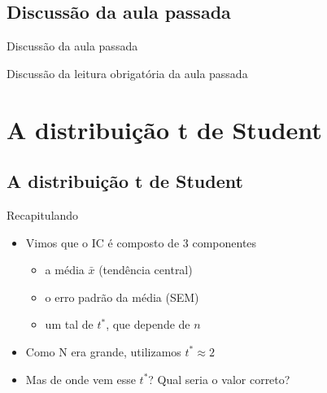 \documentclass{beamer}
\begin{document}
\subsection{Discussão da aula passada}

\begin{frame}{Discussão da aula passada}
  \begin{block}{}
    Discussão da leitura obrigatória da aula passada
  \end{block}
\end{frame}

\section[t de Student]{A distribuição t de Student}

\subsection{A distribuição t de Student}

\begin{frame}{Recapitulando}
  \begin{itemize}
  \item Vimos que o IC é composto de 3 componentes
    \begin{itemize}
    \item a média $\bar{x}$ (tendência central)
    \item o erro padrão da média (SEM)
    \item um tal de $t^{*}$, que depende de $n$
    \end{itemize}
  \item Como N era grande, utilizamos $t^{*} \approx 2$
    \bigskip
  \item Mas de onde vem esse $t^{*}$? Qual seria o valor correto?
  \end{itemize}
\end{frame}
\end{document}

